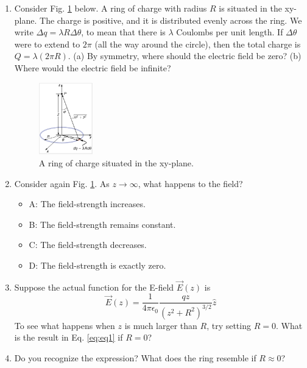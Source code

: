 \documentclass{article}
\begin{document}
\begin{enumerate}
\item Consider Fig. \ref{fig:ring} below.  A ring of charge with radius $R$ is situated in the xy-plane.  The charge is positive, and it is distributed evenly across the ring.  We write $\Delta q = \lambda R \Delta\theta$, to mean that there is $\lambda$ Coulombs per unit length.  If $\Delta\theta$ were to extend to $2\pi$ (all the way around the circle), then the total charge is $Q = \lambda (2 \pi R)$.  (a) By symmetry, where should the electric field be zero?  (b) Where would the electric field be infinite?
\begin{figure}[ht]
\centering
\includegraphics[width=0.22\textwidth]{ring.png}
\caption{\label{fig:ring} A ring of charge situated in the xy-plane.}
\end{figure}
\item Consider again Fig. \ref{fig:ring}.  As $z \rightarrow \infty$, what happens to the field?
\begin{itemize}
\item A: The field-strength increases.
\item B: The field-strength remains constant.
\item C: The field-strength decreases.
\item D: The field-strength is exactly zero.
\end{itemize}
\item Suppose the actual function for the E-field $\vec{E}(z)$ is
\begin{equation}
\vec{E}(z) = \frac{1}{4\pi \epsilon_0} \frac{q z}{\left( z^2 + R^2 \right)^{3/2}} \hat{z} \label{eq:eq1}
\end{equation}
To see what happens when $z$ is much larger than $R$, try setting $R=0$.  What is the result in Eq. \ref{eq:eq1} if $R=0$? \\ \vspace{1cm}
\item Do you recognize the expression?  What does the ring resemble if $R \approx 0$?
\end{enumerate}
\end{document}
